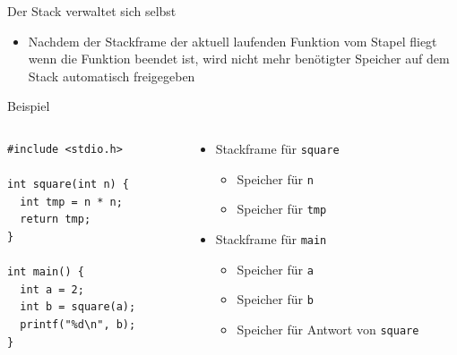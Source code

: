 \documentclass[presentation]{beamer}
\begin{document}
\begin{frame}[label={sec:org2a2695a},fragile]{Der Stack verwaltet sich selbst}
 \begin{itemize}
\item Nachdem der Stackframe der aktuell laufenden Funktion vom Stapel
fliegt wenn die Funktion beendet ist, wird nicht mehr benötigter
Speicher auf dem Stack automatisch freigegeben
\end{itemize}
\begin{exampleblock}{Beispiel}
\begin{columns}
\begin{column}{0.15\columnwidth}
\begin{verbatim}
#include <stdio.h>

int square(int n) {
  int tmp = n * n;
  return tmp;
}

int main() {
  int a = 2;
  int b = square(a);
  printf("%d\n", b);
}
\end{verbatim}
\end{column}
\begin{column}{0.7\columnwidth}
\begin{itemize}
\item Stackframe für {\color{solarizedYellow}\texttt{square}}
\begin{itemize}
\item Speicher für {\color{solarizedYellow}\texttt{n}}
\item Speicher für {\color{solarizedYellow}\texttt{tmp}}
\end{itemize}
\item Stackframe für {\color{solarizedYellow}\texttt{main}}
\begin{itemize}
\item Speicher für {\color{solarizedYellow}\texttt{a}}
\item Speicher für {\color{solarizedYellow}\texttt{b}}
\item Speicher für Antwort von {\color{solarizedYellow}\texttt{square}}
\end{itemize}
\end{itemize}
\end{column}
\end{columns}
\end{exampleblock}
\end{frame}
\end{document}

